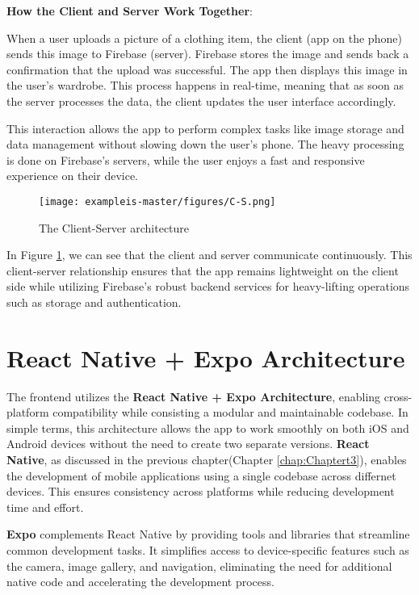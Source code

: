 \noindent \textbf{How the Client and Server Work Together}:

When a user uploads a picture of a clothing item, the client (app on the phone) sends this image to Firebase (server). Firebase stores the image and sends back a confirmation that the upload was successful. The app then displays this image in the user’s wardrobe. This process happens in real-time, meaning that as soon as the server processes the data, the client updates the user interface accordingly.

This interaction allows the app to perform complex tasks like image storage and data management without slowing down the user’s phone. The heavy processing is done on Firebase’s servers, while the user enjoys a fast and responsive experience on their device.

\begin{figure}[h]
    \centering
    \texttt{[image: exampleis-master/figures/C-S.png]}
    \caption{The Client-Server architecture \cite{client_server_arch}}
    \label{fig:client_server_architecture}
\end{figure}

In Figure \ref{fig:client_server_architecture}, we can see that the client and server communicate continuously.
This client-server relationship ensures that the app remains lightweight on the client side while utilizing Firebase’s robust backend services for heavy-lifting operations such as storage and authentication\cite{client_server_arch}.

\section{React Native + Expo Architecture}

The frontend utilizes the \textbf{React Native + Expo Architecture}, enabling cross-platform compatibility while consisting  a modular and maintainable codebase. In simple terms, this architecture allows the app to work smoothly on both iOS and Android devices without the need to create two separate versions.
\textbf{React Native}, as discussed in the previous chapter(Chapter \ref{chap:Chaptert3}), enables the development of mobile applications using a single codebase across differnet devices. This ensures consistency across platforms while reducing development time and effort.

\textbf{Expo} complements React Native by providing tools and libraries that streamline common development tasks. It simplifies access to device-specific features such as the camera, image gallery, and navigation, eliminating the need for additional native code and accelerating the development process.

